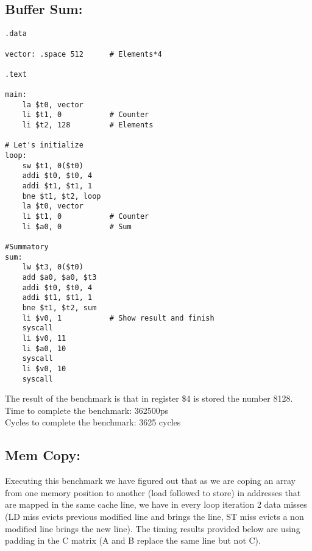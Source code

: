 \documentclass{article}
\begin{document}
\subsection{Buffer Sum:}
\vspace{5pt}
\begin{lstlisting} 
.data

vector: .space 512      # Elements*4

.text

main:
	la $t0, vector
	li $t1, 0           # Counter
	li $t2, 128         # Elements

# Let's initialize
loop:
	sw $t1, 0($t0)
	addi $t0, $t0, 4
	addi $t1, $t1, 1
	bne $t1, $t2, loop
    la $t0, vector
	li $t1, 0           # Counter
	li $a0, 0           # Sum

#Summatory
sum:
	lw $t3, 0($t0)
	add $a0, $a0, $t3
	addi $t0, $t0, 4
	addi $t1, $t1, 1
	bne $t1, $t2, sum
	li $v0, 1           # Show result and finish
    syscall
    li $v0, 11
    li $a0, 10
    syscall
	li $v0, 10
	syscall
\end{lstlisting}
The result of the benchmark is that in register \$4 is stored the number 8128.\\
Time to complete the benchmark: 362500ps\\
Cycles to complete the benchmark: 3625 cycles

\subsection{Mem Copy:}
\vspace{5pt}

Executing this benchmark we have figured out that as we are coping an array from one memory position to another (load followed to store) in addresses that are mapped in the same cache line, we have in every loop iteration 2 data misses (LD miss evicts previous modified line and brings the line, ST miss evicts a non modified line brings the new line). The timing results provided below are using padding in the C matrix (A and B replace the same line but not C).
\end{document}
